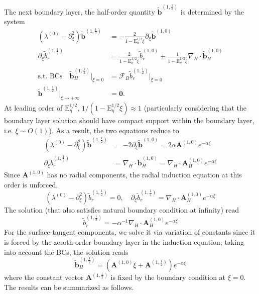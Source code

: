The next boundary layer, the half-order quantity $\widetilde{\mathbf{b}}^{(1, \frac{1}{2})}$ is determined by the system 
%
\begin{equation}
\begin{aligned}
    \left(\lambda^{(0)} - \partial_\xi^2 \right) \widetilde{\mathbf{b}}^{(1,\frac{1}{2})} &= - \frac{2}{1 - \mathrm{E}_\eta^{1/2}\xi} \partial_\xi \widetilde{\mathbf{b}}^{(1,0)} \\ 
    \partial_\xi \widetilde{b}_r^{(1,\frac{1}{2})} &= \frac{2}{1 - \mathrm{E}_\eta^{1/2}\xi} \widetilde{b}_r^{(1,0)} + \frac{1}{1 - \mathrm{E}_\eta^{1/2}\xi} \nabla_H\cdot \widetilde{\mathbf{b}}_H^{(1,0)} \\[5pt] 
    \text{s.t. BCs} \quad \widetilde{\mathbf{b}}_H^{(1,\frac{1}{2})}|_{\xi=0} &= \mathcal{F}_B \widetilde{b}_r^{(1,\frac{1}{2})}|_{\xi=0} \\ 
    \widetilde{\mathbf{b}}^{(1,\frac{1}{2})}|_{\xi\rightarrow +\infty} &= \mathbf{0}.
\end{aligned}
\end{equation}
%
At leading order of $\mathrm{E}_\eta^{1/2}$, $1/(1 - \mathrm{E}_\eta^{1/2}\xi) \approx 1$ (particularly considering that the boundary layer solution should have compact support within the boundary layer, i.e. $\xi \sim O(1)$). As a result, the two equations reduce to 
%
\begin{equation}
\begin{aligned}
    \left(\lambda^{(0)} - \partial_\xi^2 \right) \widetilde{\mathbf{b}}^{(1,\frac{1}{2})} &= - 2 \partial_\xi \widetilde{\mathbf{b}}^{(1,0)} = 2 \alpha \mathbf{A}^{(1,0)} e^{-\alpha \xi} \\ 
    \partial_\xi \widetilde{b}_r^{(1,\frac{1}{2})} &= \nabla_H\cdot \widetilde{\mathbf{b}}_H^{(1,0)} = \nabla_H\cdot \mathbf{A}_H^{(1,0)} e^{-\alpha \xi}
\end{aligned}
\end{equation}
%
Since $\mathbf{A}^{(1,0)}$ has no radial components, the radial induction equation at this order is unforced,
%
\begin{equation}
    \left(\lambda^{(0)} - \partial_\xi^2 \right) \widetilde{b}_r^{(1,\frac{1}{2})} = 0,\quad \partial_\xi \widetilde{b}_r^{(1,\frac{1}{2})} = \nabla_H\cdot \mathbf{A}_H^{(1,0)} e^{-\alpha \xi}
\end{equation}
%
The solution (that also satisfies natural boundary condition at infinity) read
%
\begin{equation}
    \widetilde{b}_r^{(1,\frac{1}{2})} = -\alpha^{-1} \nabla_H\cdot \mathbf{A}_H^{(1,0)} e^{-\alpha \xi}
\end{equation}
%
For the surface-tangent components, we solve it via variation of constants since it is forced by the zeroth-order boundary layer in the induction equation; taking into account the BCs, the solution reads
%
\begin{equation}
    \widetilde{\mathbf{b}}_H^{(1,\frac{1}{2})} = \left(\mathbf{A}^{(1,0)}\xi + \mathbf{A}^{(1,\frac{1}{2})}\right) e^{-\alpha \xi}
\end{equation}
%
where the constant vector $\mathbf{A}^{(1,\frac{1}{2})}$ is fixed by the boundary condition at $\xi=0$. The results can be summarized as follows.

